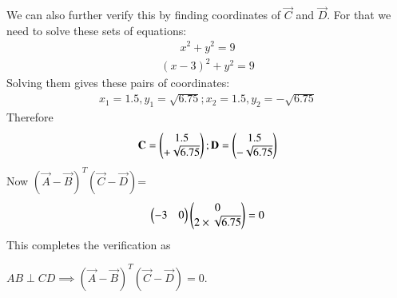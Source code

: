 \documentclass[journal,12pt,twocolumn]{IEEEtran}
\begin{document}
We can also further verify this by finding coordinates of $\vec{C}$ and $\vec{D}$.
For that we need to solve these sets of equations:
\begin{align}
x^2+y^2=9
\end{align}
\begin{align}
(x-3)^2+y^2=9
\end{align}
Solving them gives these pairs of coordinates:
\begin{align}
x_{1}=1.5,y_{1}={\sqrt{6.75}};x_{2}=1.5,y_{2}={-\sqrt{6.75}}
\end{align}
Therefore
\begin{align}
\mathbf{C}=\begin{pmatrix}1.5\\+\sqrt{6.75}\end{pmatrix};\mathbf{D}=\begin{pmatrix}1.5\\-\sqrt{6.75}\end{pmatrix}
\end{align}
Now $(\vec{A}-\vec{B})^T(\vec{C}-\vec{D})$=
\begin{align}
\begin{pmatrix}-3 & 0\end{pmatrix}\begin{pmatrix}0\\2\times\sqrt{6.75}\end{pmatrix}=0
\end{align}
This completes the verification as

$AB\perp CD\implies (\vec{A}-\vec{B})^T(\vec{C}-\vec{D})=0$.
\end{document}

